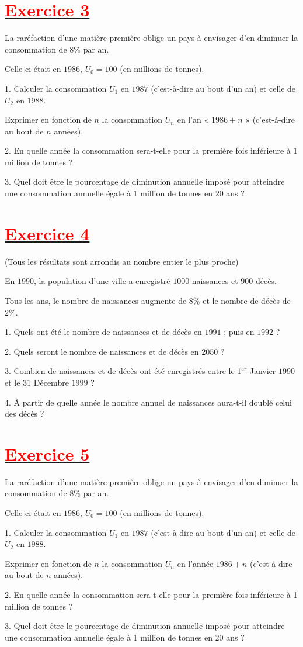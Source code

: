 \documentclass[12pt]{article}
\begin{document}
\section*{\underline{\textbf{\textcolor{red}{Exercice 3}}}}
La raréfaction d'une matière première oblige un pays à envisager d'en diminuer la consommation de $8\%$ par an. 
	
Celle-ci était en $1986$, $U_{0}=100$ (en millions de tonnes).
	
1. Calculer la consommation $U_{1}$ en $1987$ (c'est-à-dire au bout d'un an) et celle de $U_{2}$ en $1988$.
	
Exprimer en fonction de $n$ la consommation $U_{n}$ en l'an « $1986+n$ » (c'est-à-dire au bout de $n$ années).

2. En quelle année la consommation sera-t-elle pour la première fois inférieure à $1$ million de tonnes ?
	
3. Quel doit être le pourcentage de diminution annuelle imposé pour atteindre une consommation annuelle égale à $1$ million de tonnes en $20$ ans ?
\section*{\underline{\textbf{\textcolor{red}{Exercice 4}}}}
(Tous les résultats sont arrondis au nombre entier le plus proche)
	
En $1990$, la population d'une ville a enregistré $1000$ naissances et $900$ décès. 
	
Tous les ans, le nombre de naissances augmente de $8\%$ et le nombre de décès de $2\%$.
	
1. Quels ont été le nombre de naissances et de décès en $1991$ ; puis en $1992$ ?
	
2. Quels seront le nombre de naissances et de décès en $2050$ ?
	
3. Combien de naissances et de décès ont été enregistrés entre le $1^{er}$ Janvier $1990$ et le $31$ Décembre $1999$ ?
	
4. À partir de quelle année le nombre annuel de naissances aura-t-il doublé celui des décès ?
\section*{\underline{\textbf{\textcolor{red}{Exercice 5}}}}
La raréfaction d'une matière première oblige un pays à envisager d'en diminuer la consommation de $8\%$ par an.
	
Celle-ci était en $1986$, $U_{0}=100$ (en millions de tonnes).
	
1. Calculer la consommation $U_{1}$ en $1987$ (c'est-à-dire au bout d'un an) et celle de $U_{2}$ en $1988$.
	
Exprimer en fonction de $n$ la consommation $U_{n}$ en l'année $1986+n$ (c'est-à-dire au bout de $n$ années).
	
2. En quelle année la consommation sera-t-elle pour la première fois inférieure à 1 million de tonnes ?
	
3. Quel doit être le pourcentage de diminution annuelle imposé pour atteindre une consommation annuelle égale à 1 million de tonnes en 20 ans ?
\end{document}
